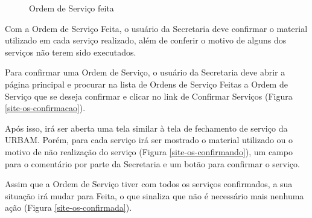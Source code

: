 \documentclass[
	article,			%
	11pt,				%
	oneside,			%
	a4paper,			%
	english,			%
	brazil,				%
	sumario=tradicional
	]{abntex2}
\begin{document}
\begin{figure}[!htbp]
 \centering
 \caption{\label{site-os-feita}Ordem de Serviço feita}
\end{figure}

\clearpage

Com a Ordem de Serviço Feita, o usuário da Secretaria deve confirmar o material utilizado em cada serviço realizado, além de conferir o motivo de alguns dos serviços não terem sido executados.

Para confirmar uma Ordem de Serviço, o usuário da Secretaria deve abrir a página principal e procurar na lista de Ordens de Serviço Feitas a Ordem de Serviço que se deseja confirmar e clicar no link de Confirmar Serviços (Figura \ref{site-os-confirmacao}).

Após isso, irá ser aberta uma tela similar à tela de fechamento de serviço da URBAM. Porém, para cada serviço irá ser mostrado o material utilizado ou o motivo de não realização do serviço (Figura \ref{site-os-confirmando}), um campo para o comentário por parte da Secretaria e um botão para confirmar o serviço.

Assim que a Ordem de Serviço tiver com todos os serviços confirmados, a sua situação irá mudar para Feita, o que sinaliza que não é necessário mais nenhuma ação (Figura \ref{site-os-confirmada}).
\end{document}
